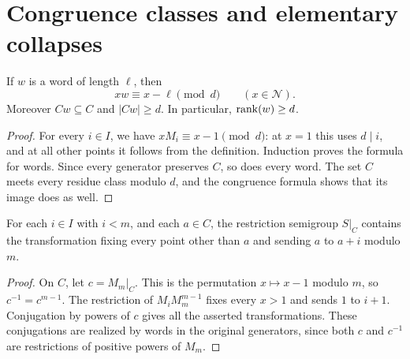
\section{Congruence classes and elementary collapses}

\begin{lemma}\label{ptc-kernel:lem:lower}
If $w$ is a word of length $\ell$, then
\[
 xw\equiv x-\ell\pmod d\qquad(x\in\mathcal N).
\]
Moreover $Cw\subseteq C$ and $|Cw|\ge d$. In particular, $\operatorname{rank}(w)\ge d$.
\end{lemma}
\begin{proof}
For every $i\in I$, we have $xM_i\equiv x-1\pmod d$: at $x=1$ this
uses $d\mid i$, and at all other points it follows from the definition.
Induction proves the formula for words. Since every generator preserves
$C$, so does every word. The set $C$ meets every residue class modulo
$d$, and the congruence formula shows that its image does as well.
\end{proof}

\begin{lemma}\label{ptc-kernel:lem:collapse}
For each $i\in I$ with $i<m$, and each $a\in C$, the restriction
semigroup $S|_C$ contains the transformation fixing every point other
than $a$ and sending $a$ to $a+i$ modulo $m$.
\end{lemma}
\begin{proof}
On $C$, let $c=M_m|_C$. This is the permutation $x\mapsto x-1$
modulo $m$, so $c^{-1}=c^{m-1}$. The restriction of
$M_iM_m^{m-1}$ fixes every $x>1$ and sends $1$ to $i+1$.
Conjugation by powers of $c$ gives all the asserted transformations.
These conjugations are realized by words in the original generators,
since both $c$ and $c^{-1}$ are restrictions of positive powers of $M_m$.
\end{proof}

